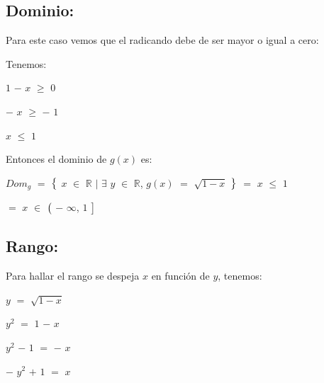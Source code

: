 \documentclass[12pt]{article}
\begin{document}
\subsection*{{\textcolor{Lochinvar}{\bfseries{Dominio}:}}} Para este caso vemos que el radicando debe de ser mayor o igual a cero: \vspace{0.5cm}

Tenemos: \vspace{0.5cm}

\hspace{4cm} $1$ $-$ $x$ $\geq$ $0$ \vspace{0.5cm}

\hspace{4cm} $-$ $x$ $\geq$ $-$ $1$   \vspace{0.5cm}

\hspace{4.5cm}  $x$ $\leq$ $1$   \vspace{0.5cm}

Entonces el dominio de $g(x)$ es: \vspace{0.5cm} 

\hspace{1cm} $Dom_{g}$ $=$ $\big{\{}$ $x$ $\in$ $\mathbb{R}$ $\mid$ $\exists$ $y$ $\in$ $\mathbb{R}$, $g(x)$ $=$ $\sqrt{1-x}$ $\big{\}}$ $=$ $x$ $\leq$ $1$ \vspace{0.5cm}

\hspace{11.1cm} $=$ $x$ $\in$ $\big{(}$ $-$ $\infty$, $1$ $\big{]}$ \vspace{0.5cm}

\subsection*{{\textcolor{Lochinvar}{\bfseries{Rango}:}}} Para hallar el rango se despeja $x$ en función de $y$, tenemos: \vspace{0.5cm}

\hspace{4cm} $y$ $=$ $\sqrt{1-x}$ \vspace{0.5cm}

\hspace{4cm} $y^{2}$ $=$ $1$ $-$ $x$ \vspace{0.5cm}

\hspace{4cm} $y^{2}$ $-$ $1$ $=$ $-$ $x$ \vspace{0.5cm}

\hspace{4cm} $-$ $y^{2}$ $+$ $1$ $=$ $x$ \vspace{0.5cm}
\end{document}
